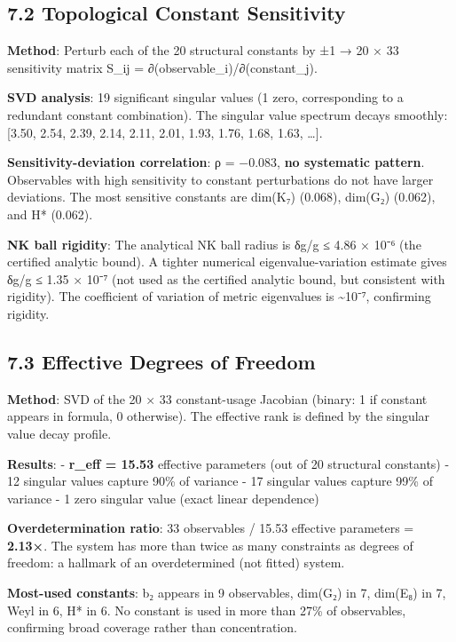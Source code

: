 \documentclass[11pt,a4paper]{article}
\begin{document}
\subsection{7.2 Topological Constant Sensitivity}\label{topological-constant-sensitivity}

\textbf{Method}: Perturb each of the 20 structural constants by ±1 → 20 × 33 sensitivity matrix S\_\allowbreak{}ij = ∂(observable\_\allowbreak{}i)/∂(constant\_\allowbreak{}j).

\textbf{SVD analysis}: 19 significant singular values (1 zero, corresponding to a redundant constant combination). The singular value spectrum decays smoothly: {[}3.50, 2.54, 2.39, 2.14, 2.11, 2.01, 1.93, 1.76, 1.68, 1.63, \ldots{]}.

\textbf{Sensitivity-deviation correlation}: ρ = −0.083, \textbf{no systematic pattern}. Observables with high sensitivity to constant perturbations do not have larger deviations. The most sensitive constants are dim(K₇) (0.068), dim(G₂) (0.062), and H* (0.062).

\textbf{NK ball rigidity}: The analytical NK ball radius is δg/g ≤ 4.86 × 10⁻⁶ (the certified analytic bound). A tighter numerical eigenvalue-variation estimate gives δg/g ≤ 1.35 × 10⁻⁷ (not used as the certified analytic bound, but consistent with rigidity). The coefficient of variation of metric eigenvalues is \textasciitilde10⁻⁷, confirming rigidity.

\subsection{7.3 Effective Degrees of Freedom}\label{effective-degrees-of-freedom}

\textbf{Method}: SVD of the 20 × 33 constant-usage Jacobian (binary: 1 if constant appears in formula, 0 otherwise). The effective rank is defined by the singular value decay profile.

\textbf{Results}: - \textbf{r\_\allowbreak{}eff = 15.53} effective parameters (out of 20 structural constants) - 12 singular values capture 90\% of variance - 17 singular values capture 99\% of variance - 1 zero singular value (exact linear dependence)

\textbf{Overdetermination ratio}: 33 observables / 15.53 effective parameters = \textbf{2.13×}. The system has more than twice as many constraints as degrees of freedom: a hallmark of an overdetermined (not fitted) system.

\textbf{Most-used constants}: b₂ appears in 9 observables, dim(G₂) in 7, dim(E₈) in 7, Weyl in 6, H* in 6. No constant is used in more than 27\% of observables, confirming broad coverage rather than concentration.
\end{document}
